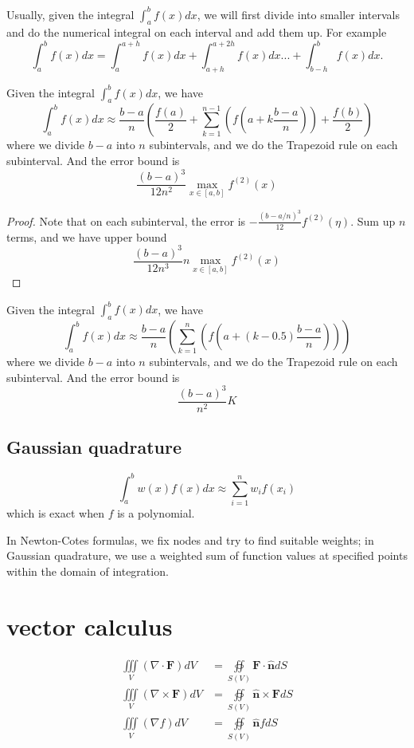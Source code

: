 \begin{refsection}
\begin{remark}
	Usually, given the integral $\int_a^b f(x)dx$, we will first divide into smaller intervals and do the numerical integral on each interval and add them up. For example
	$$\int_a^b f(x)dx = \int_a^{a+h} f(x)dx + \int_{a+h}^{a+2h}f(x)dx ... + \int_{b-h}^b f(x)dx.$$
\end{remark}

\begin{lemma}\label{appendix:numericalintegralTrapezoidruleerrorbound}
Given the integral $\int_a^b f(x)dx$, we have
$$\int_a^b f(x)dx \approx \frac{b-a}{n}(\frac{f(a)}{2} + \sum_{k=1}^{n-1}(f(a + k\frac{b-a}{n})) + \frac{f(b)}{2} )$$
where we divide $b-a$ into $n$ subintervals, and we do the Trapezoid rule on each subinterval.
And the error bound is
$$\frac{(b-a)^3}{12n^2} \max_{x\in [a,b]} f^{(2)}(x) $$
\end{lemma}
\begin{proof}
Note that on each subinterval, the error is $-\frac{(b-a/n)^3}{12}f^{(2)}(\eta)$. Sum up $n$ terms, and we have upper bound
$$\frac{(b-a)^3}{12n^3} n \max_{x\in [a,b]} f^{(2)}(x) $$
\end{proof}

\begin{lemma}
	Given the integral $\int_a^b f(x)dx$, we have
	$$\int_a^b f(x)dx \approx \frac{b-a}{n}( \sum_{k=1}^{n}(f(a + (k-0.5)\frac{b-a}{n})) )$$
	where we divide $b-a$ into $n$ subintervals, and we do the Trapezoid rule on each subinterval.
	And the error bound is
	$$\frac{(b-a)^3}{n^2} K $$
\end{lemma}


\subsection{Gaussian quadrature}

$$\int_a^b w(x)f(x)dx \approx \sum_{i=1}^n w_i f(x_i)$$
which is exact when $f$ is a polynomial.

\begin{remark}
In Newton-Cotes formulas, we fix nodes and try to find suitable weights; in Gaussian quadrature, we use a weighted sum of function values at specified points within the domain of integration.
\end{remark}

\section{vector calculus}
\begin{lemma}\label{appendix:th:divergencetheorem}
	\begin{align*}
	\iiint\limits_V(\nabla \cdot \mathbf{F}) dV
	& = \oiint \limits_{S(V)} \mathbf{F \cdot \hat{n}} dS \\      \iiint\limits_V(\nabla \times \mathbf{F}) dV
	& = \oiint \limits_{S(V)} \mathbf{\hat{n} \times F} dS \\      \iiint\limits_V(\nabla f) dV
	& = \oiint\limits_{S(V)}\mathbf{\hat{n}}f dS
	\end{align*}
\end{lemma}



\end{refsection}
